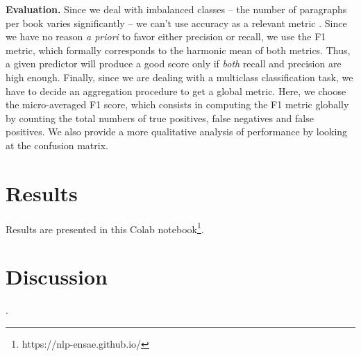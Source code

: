 \documentclass[11pt,a4paper]{article}
\begin{document}
\textbf{Evaluation.}  Since we deal with imbalanced classes -- the number of paragraphs per book varies significantly -- we can't use accuracy as a relevant metric . Since we have no reason \textit{a priori} to favor either precision or recall, we use the F1 metric, which formally corresponds to the harmonic mean of both metrics. Thus, a given predictor will produce a good score only if \emph{both} recall and precision are high enough. Finally, since we are dealing with a multiclass classification task, we have to decide an aggregation procedure to get a global metric. Here, we choose the micro-averaged F1 score, which consists in computing the F1 metric globally by counting the total numbers of true positives, false negatives and false positives. We also provide a more qualitative analysis of performance by looking at the confusion matrix.

\section{Results}

Results are presented in this Colab notebook\footnote{https://nlp-ensae.github.io/}.

\section{Discussion}




\newpage
.
\newpage




\appendix
\end{document}
